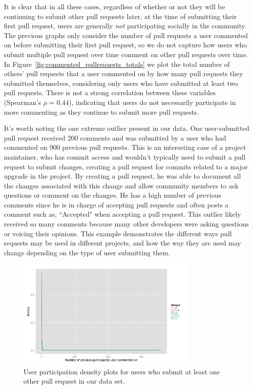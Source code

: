 \documentclass{sigchi}
\begin{document}
It is clear that in all these cases, regardless of whether or not they will be
continuing to submit other pull requests later, at the time of submitting their
first pull request, users are generally \textit{not} participating socially in
the community. The previous graphs only consider the number of pull requests a
user commented on before submitting their first pull request, so we do not
capture how users who submit multiple pull request over time comment on other
pull requests over time. In Figure~\ref{fig:commented_pullrequests_totals} we
plot the total number of others' pull requests that a user commented on by how
many pull requests they submitted themselves, considering only users who have
submitted at least two pull requests. There is not a strong correlation between
these variables (Spearman's $\rho$ = 0.44), indicating that users do not
necessarily participate in more commenting as they continue to submit more pull
requests.

It's worth noting the one extreme outlier present in our data. One
user-submitted pull request received 200 comments and was submitted by a user
who had commented on 900 previous pull requests. This is an interesting case of
a project maintainer, who has commit access and wouldn't typically need to
submit a pull request to submit changes, creating a pull request for commits
related to a major upgrade in the project. By creating a pull request, he was
able to document all the changes associated with this change and allow community
members to ask questions or comment on the changes. He has a high number of
previous comments since he is in charge of accepting pull requests and often
posts a comment such as, ``Accepted" when accepting a pull request. This outlier
likely received so many comments because many other developers were asking
questions or voicing their opinions. This example demonstrates the different
ways pull requests may be used in different projects, and how the way they are
used may change depending on the type of user submitting them.

\begin{figure}[p] \centering
\includegraphics[width=0.8\textwidth]{figures/number_comments_density_repeaters_ggplot.png}
\caption{User participation density plots for users who submit at least one
other pull request in our data set.} \label{fig:repeaters} \end{figure}
\end{document}
